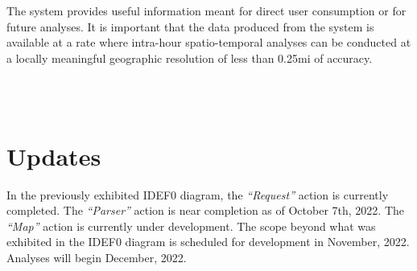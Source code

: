 \documentclass{article}
\begin{document}
The system provides useful information meant for direct user consumption or for future analyses. It is important that the data produced from the system is available at a rate where intra-hour spatio-temporal analyses can be conducted at a locally meaningful geographic resolution of less than 0.25mi of accuracy. 

\\~\\

\section*{Updates}
In the previously exhibited IDEF0 diagram, the \textit{``Request''} action is currently completed. The \textit{``Parser''} action is near completion as of October 7th, 2022. The \textit{``Map''} action is currently under development. The scope beyond what was exhibited in the IDEF0 diagram is scheduled for development in November, 2022. Analyses will begin December, 2022. 
\end{document}
